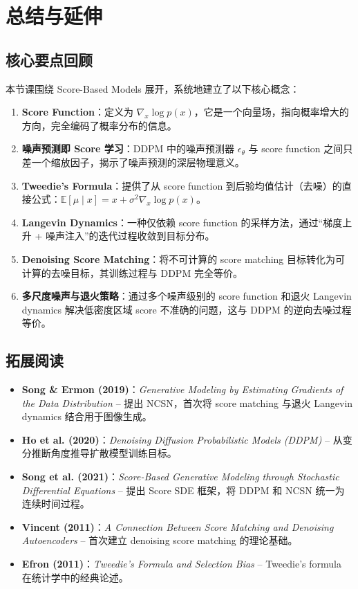 \section{总结与延伸}

\subsection{核心要点回顾}

本节课围绕 Score-Based Models 展开，系统地建立了以下核心概念：

\begin{enumerate}
    \item \textbf{Score Function}：定义为 $\nabla_x \log p(x)$，它是一个向量场，指向概率增大的方向，完全编码了概率分布的信息。

    \item \textbf{噪声预测即 Score 学习}：DDPM 中的噪声预测器 $\epsilon_\theta$ 与 score function 之间只差一个缩放因子，揭示了噪声预测的深层物理意义。

    \item \textbf{Tweedie's Formula}：提供了从 score function 到后验均值估计（去噪）的直接公式：$\mathbb{E}[\mu \mid x] = x + \sigma^2 \nabla_x \log p(x)$。

    \item \textbf{Langevin Dynamics}：一种仅依赖 score function 的采样方法，通过``梯度上升 + 噪声注入''的迭代过程收敛到目标分布。

    \item \textbf{Denoising Score Matching}：将不可计算的 score matching 目标转化为可计算的去噪目标，其训练过程与 DDPM 完全等价。

    \item \textbf{多尺度噪声与退火策略}：通过多个噪声级别的 score function 和退火 Langevin dynamics 解决低密度区域 score 不准确的问题，这与 DDPM 的逆向去噪过程等价。
\end{enumerate}

\subsection{拓展阅读}

\begin{itemize}
    \item \textbf{Song \& Ermon (2019)}：\textit{Generative Modeling by Estimating Gradients of the Data Distribution} -- 提出 NCSN，首次将 score matching 与退火 Langevin dynamics 结合用于图像生成。
    \item \textbf{Ho et al. (2020)}：\textit{Denoising Diffusion Probabilistic Models (DDPM)} -- 从变分推断角度推导扩散模型训练目标。
    \item \textbf{Song et al. (2021)}：\textit{Score-Based Generative Modeling through Stochastic Differential Equations} -- 提出 Score SDE 框架，将 DDPM 和 NCSN 统一为连续时间过程。
    \item \textbf{Vincent (2011)}：\textit{A Connection Between Score Matching and Denoising Autoencoders} -- 首次建立 denoising score matching 的理论基础。
    \item \textbf{Efron (2011)}：\textit{Tweedie's Formula and Selection Bias} -- Tweedie's formula 在统计学中的经典论述。
\end{itemize}



